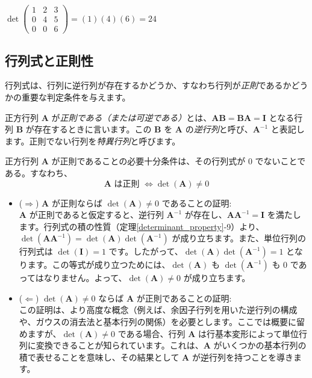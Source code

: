 \begin{ex}
    $\det\begin{pmatrix} 1 & 2 & 3 \\ 0 & 4 & 5 \\ 0 & 0 & 6 \end{pmatrix} = (1)(4)(6) = 24$
\end{ex}

\subsection{行列式と正則性}

行列式は、行列に逆行列が存在するかどうか、すなわち行列が\emph{正則}であるかどうかの重要な判定条件を与えます。

\begin{dfn}[正則行列と特異行列] \label{regular_matrix}
正方行列 $\bm{A}$ が\emph{正則である（または可逆である）}とは、$\bm{A}\bm{B} = \bm{B}\bm{A} = \bm{I}$ となる行列 $\bm{B}$ が存在するときに言います。この $\bm{B}$ を $\bm{A}$ の\emph{逆行列}と呼び、$\bm{A}^{-1}$ と表記します。正則でない行列を\emph{特異行列}と呼びます。
\end{dfn}

\begin{thm}[行列式と正則性の関係] \label{determinant_and regular_matrix}
正方行列 $\bm{A}$ が正則であることの必要十分条件は、その行列式が $0$ でないことである。すなわち、
\[ \bm{A} \text{ は正則 } \iff \det(\bm{A}) \neq 0 \]
\begin{proof*}
\begin{itemize}
\item ($\Rightarrow$) $\bm{A}$ が正則ならば $\det(\bm{A}) \neq 0$ であることの証明:\\
$\bm{A}$ が正則であると仮定すると、逆行列 $\bm{A}^{-1}$ が存在し、$\bm{A}\bm{A}^{-1} = \bm{I}$ を満たします。行列式の積の性質（定理\ref{determinant_property}-9）より、$\det(\bm{A}\bm{A}^{-1}) = \det(\bm{A})\det(\bm{A}^{-1})$ が成り立ちます。また、単位行列の行列式は $\det(\bm{I}) = 1$ です。したがって、$\det(\bm{A})\det(\bm{A}^{-1}) = 1$ となります。この等式が成り立つためには、$\det(\bm{A})$ も $\det(\bm{A}^{-1})$ も $0$ であってはなりません。よって、$\det(\bm{A}) \neq 0$ が成り立ちます。
\item ($\Leftarrow$) $\det(\bm{A}) \neq 0$ ならば $\bm{A}$ が正則であることの証明:\\
この証明は、より高度な概念（例えば、余因子行列を用いた逆行列の構成や、ガウスの消去法と基本行列の関係）を必要とします。ここでは概要に留めますが、$\det(\bm{A}) \neq 0$ である場合、行列 $\bm{A}$ は行基本変形によって単位行列に変換できることが知られています。これは、$\bm{A}$ がいくつかの基本行列の積で表せることを意味し、その結果として $\bm{A}$ が逆行列を持つことを導きます。
\end{itemize}
\end{proof*}
\end{thm}


